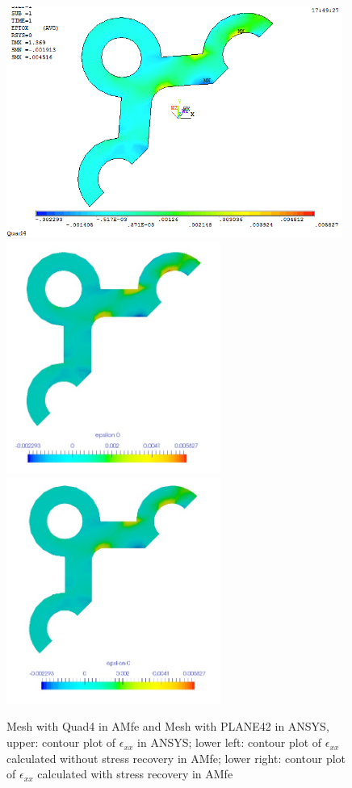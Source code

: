 \begin{figure}[htbp]
	\begin{center}
		\includegraphics[width=11cm,clip]{Quad4_Exx.png} 
		\includegraphics[width=7cm,clip]{Quad4_Exx_PD.png} 				
		\includegraphics[width=7cm,clip]{Quad4_Exx_P.png} 		
		\caption{Mesh with Quad4 in AMfe and Mesh with PLANE42 in ANSYS, upper: contour plot of $\epsilon_{xx}$ in ANSYS; lower left: contour plot of $\epsilon_{xx}$ calculated without stress recovery in AMfe; lower right: contour plot of $\epsilon_{xx}$ calculated with stress recovery in AMfe} \label{fig: Quad4_Exx}
	\end{center}
\end{figure}
\clearpage 

